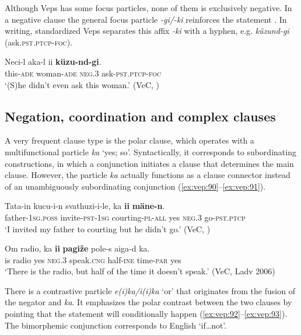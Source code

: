 \documentclass[output=paper,colorlinks=true, citecolor=brown]{langscibook}
\begin{document}
Although Veps has some focus particles, none of them is exclusively negative. In a negative clause the general focus particle \textit{{}-gi/-ki} reinforces the statement . In writing, standardized Veps separates this affix \textit{{}-ki} with a hyphen, e.g. \textit{küzund-gi} (ask.\textsc{pst.ptcp-foc}).

\ea\label{ex:vep:89}
    \gll Neci{}-l  aka{}-l ii \textbf{küzu{}-nd{}-gi}. \\
         this-\textsc{ade} woman-\textsc{ade} \textsc{neg.3} ask-\textsc{pst.ptcp}{}-\textsc{foc}\\
    \glt ‘(S)he didn’t even ask this woman.’ (VeC, \citealt[118]{MSFOu70})
\z

\subsection{Negation, coordination and complex clauses}\label{sec:vep:4.5}

A very frequent clause type is the polar clause, which operates with a multifunctional particle \textit{ka} ‘yes; so’. Syntactically, it corresponds to subordinating constructions, in which a conjunction initiates a clause that determines the main clause. However, the particle \textit{ka} actually functions as a clause connector instead of an unambiguously subordinating conjunction (\ref{ex:vep:90}–\ref{ex:vep:91}). 

\ea\label{ex:vep:90}
    \gll Tata-in  kucu-i-n  svathuzi-i-le,  ka \textbf{ii} \textbf{mäne-n}.\\
         father-\textsc{1sg.poss} invite-\textsc{pst-1sg}  courting{}-\textsc{pl}{}-\textsc{all}  yes \textsc{neg.3} go-\textsc{pst.ptcp}\\
    \glt ‘I invited my father to courting but he didn’t go.’ (VeC, \citealt[37]{MSFOu70})
\z

\ea\label{ex:vep:91}
    \gll  Om radio, ka \textbf{ii} \textbf{pagiže} pole-s aiga-d ka.\\
         is radio yes \textsc{neg.3} speak.\textsc{cng} half{}-\textsc{ine} time-\textsc{par} yes\\
    \glt ‘There is the radio, but half of the time it doesn’t speak.’ (VeC, Ladv 2006)
\z

There is a contrastive particle \textit{e(i)ka/i(i)ka} ‘or’ that originates from the fusion of the negator and \textit{ka}. It emphasizes the polar contrast between the two clauses by pointing that the statement will conditionally happen (\ref{ex:vep:92}--\ref{ex:vep:93}). The bimorphemic conjunction corresponds to English ‘if…not’.
\end{document}
